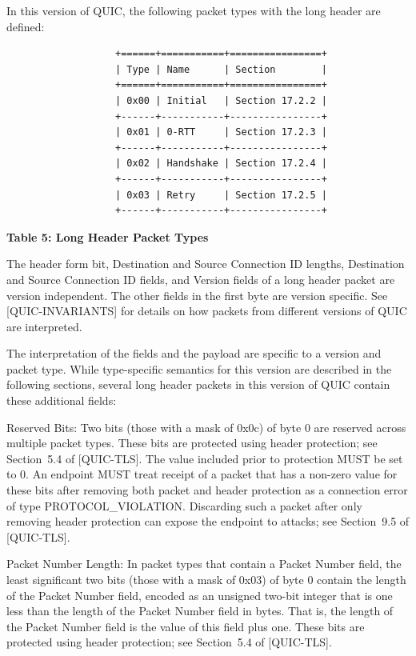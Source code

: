 \documentclass{article}
\begin{document}
In this version of QUIC, the following packet types with the long header are defined:

\begin{verbatim}
                   +======+===========+================+
                   | Type | Name      | Section        |
                   +======+===========+================+
                   | 0x00 | Initial   | Section 17.2.2 |
                   +------+-----------+----------------+
                   | 0x01 | 0-RTT     | Section 17.2.3 |
                   +------+-----------+----------------+
                   | 0x02 | Handshake | Section 17.2.4 |
                   +------+-----------+----------------+
                   | 0x03 | Retry     | Section 17.2.5 |
                   +------+-----------+----------------+
\end{verbatim}

\begin{center}
\textbf{Table 5: Long Header Packet Types}
\end{center}

The header form bit, Destination and Source Connection ID lengths, Destination and Source Connection ID fields, and Version fields of a long header packet are version independent.  The other fields in the first byte are version specific.  See [QUIC-INVARIANTS] for details on how packets from different versions of QUIC are interpreted.

The interpretation of the fields and the payload are specific to a version and packet type.  While type-specific semantics for this version are described in the following sections, several long header packets in this version of QUIC contain these additional fields:

Reserved Bits:  Two bits (those with a mask of 0x0c) of byte 0 are reserved across multiple packet types.  These bits are protected using header protection; see Section~5.4 of [QUIC-TLS].  The value included prior to protection MUST be set to 0.  An endpoint MUST treat receipt of a packet that has a non-zero value for these bits after removing both packet and header protection as a connection error of type PROTOCOL\_VIOLATION.  Discarding such a packet after only removing header protection can expose the endpoint to attacks; see Section~9.5 of [QUIC-TLS].

Packet Number Length:  In packet types that contain a Packet Number field, the least significant two bits (those with a mask of 0x03) of byte 0 contain the length of the Packet Number field, encoded as an unsigned two-bit integer that is one less than the length of the Packet Number field in bytes.  That is, the length of the Packet Number field is the value of this field plus one.  These bits are protected using header protection; see Section~5.4 of [QUIC-TLS].
\end{document}
